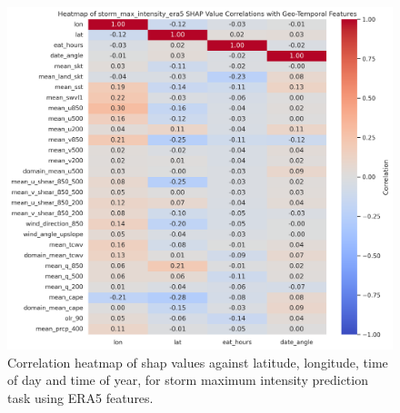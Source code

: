 \begin{figure}[ht]
    \centering
    \includegraphics[width=\textwidth]{../figures/generated/experiments/storm_max_intensity/storm_max_intensity_era5_shap_correlation_heatmap.png}
    \caption{Correlation heatmap of \acrshort{shap} values against latitude, longitude, time of day and time of year, for storm maximum intensity prediction task using ERA5 features.}
    \label{fig:storm_max_intensity_era5_shap_heatmap}
\end{figure}

